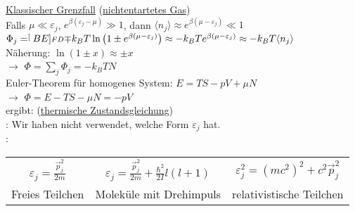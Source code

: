 \begin{tabbing}
\underline{Klassischer Grenzfall} (\glqq \underline{nichtentartetes Gas}\grqq)\\
Falls $\mu \ll\varepsilon_j$, $e^{\beta(\varepsilon_j - \mu)} \gg 1$, dann $\langle n_j \rangle \approx e^{\beta (\mu - \varepsilon_j)}\ll 1$\\
$\Phi_j = \stackrel[\scriptstyle{BE}]{\scriptstyle{FD}}{\mp} k_B T \ln\left(1\pm e^{\beta(\mu - \varepsilon_j)}\right)\approx - k_B T e^{\beta (\mu - \varepsilon_j)}\approx - k_B T \langle n_j \rangle$\\
Näherung: $\ln (1\pm x)\approx \pm x$\\
$\rightarrow$\> $\Phi = \sum\limits_j \Phi_j = - k_B T N$\\
Euler-Theorem für homogenes System: $E = T S - p V + \mu N$\\
$\rightarrow$\> $\Phi = E - T S - \mu N = - p V$\\
ergibt: \>  (\underline{thermische Zustandsgleichung})\\
: Wir haben nicht verwendet, welche Form $\varepsilon_j$ hat.\\
:
\end{tabbing}
\setlength{\tabcolsep}{2em}
\begin{table}[H]
  \centering
  \begin{tabular}{c c c}
  $\varepsilon_j = \frac{\vec{p}_j^2}{2 m}$ & $\varepsilon_j = \frac{\vec{p}_j^2}{2 m} + \frac{\hbar^2}{2 I}l (l+1)$ & $\varepsilon_j^2 = (mc^2)^2 + c^2\vec{p}_j^2$\\
  Freies Teilchen & Moleküle mit Drehimpuls & relativistische Teilchen \\
  \end{tabular}
\end{table}
\setlength{\tabcolsep}{1pt}
